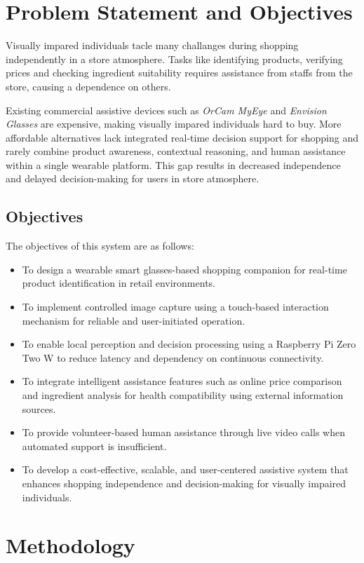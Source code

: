 \documentclass[conference]{IEEEtran}
\begin{document}
\section{Problem Statement and Objectives}
Visually impared individuals tacle many challanges during shopping independently in a store atmosphere. Tasks like identifying products, verifying prices and checking ingredient suitability requires assistance from staffs from the store, causing a dependence on others.

Existing commercial assistive devices such as \textit{OrCam MyEye} and \textit{Envision Glasses} are expensive, making visually impared individuals hard to buy. More affordable alternatives lack integrated real-time decision support for shopping and rarely combine product awareness, contextual reasoning, and human assistance within a single wearable platform. This gap results in decreased independence and delayed decision-making for users in store atmosphere.

\subsection{Objectives}
The objectives of this system are as follows:
\begin{itemize}
\item To design a wearable smart glasses-based shopping companion for real-time product identification in retail environments.
\item To implement controlled image capture using a touch-based interaction mechanism for reliable and user-initiated operation.
\item To enable local perception and decision processing using a Raspberry Pi Zero Two W to reduce latency and dependency on continuous connectivity.
\item To integrate intelligent assistance features such as online price comparison and ingredient analysis for health compatibility using external information sources.
\item To provide volunteer-based human assistance through live video calls when automated support is insufficient.
\item To develop a cost-effective, scalable, and user-centered assistive system that enhances shopping independence and decision-making for visually impaired individuals.
\end{itemize}


\section{Methodology}
\end{document}
